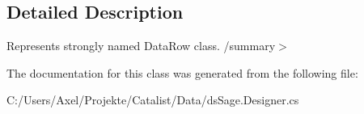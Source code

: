 \subsection{Detailed Description}
Represents strongly named Data\+Row class. /summary$>$ 

The documentation for this class was generated from the following file\+:\begin{DoxyCompactItemize}
\item 
C\+:/\+Users/\+Axel/\+Projekte/\+Catalist/\+Data/ds\+Sage.\+Designer.\+cs\end{DoxyCompactItemize}
